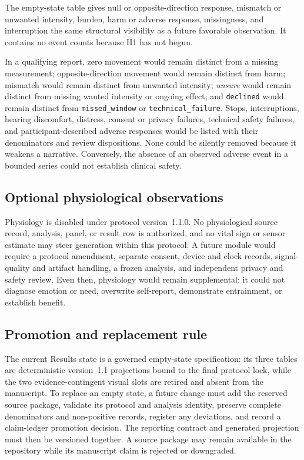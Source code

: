 The empty-state table gives null or opposite-direction response, mismatch or
unwanted intensity, burden, harm or adverse response, missingness, and
interruption the same structural visibility as a future favorable observation.
It contains no event counts because H1 has not begun.

\FloatBarrier

In a qualifying report, zero movement would remain distinct from a missing
measurement; opposite-direction movement would remain distinct from harm;
mismatch would remain distinct from unwanted intensity; \emph{unsure} would
remain distinct from missing wanted intensity or ongoing effect; and \texttt{declined} would
remain distinct from \texttt{missed\_window} or
\texttt{technical\_failure}. Stops,
interruptions, hearing discomfort, distress, consent or privacy failures,
technical safety failures, and participant-described adverse responses would
be listed with their denominators and review dispositions. None could be
silently removed because it weakens a narrative. Conversely, the absence of an
observed adverse event in a bounded series could not establish clinical safety.

\subsection{Optional physiological observations}
\label{sec:results-optional-physiology}

Physiology is disabled under protocol version~1.1.0. No physiological source
record, analysis, panel, or result row is authorized, and no vital sign or
sensor estimate may steer generation within this protocol. A future module
would require a protocol amendment, separate consent, device and clock records,
signal-quality and artifact handling, a frozen analysis, and independent
privacy and safety review. Even then, physiology would remain supplemental: it
could not diagnose emotion or need, overwrite self-report, demonstrate
entrainment, or establish benefit.

\subsection{Promotion and replacement rule}
\label{sec:results-promotion-rule}

The current Results state is a governed empty-state specification: its three
tables are deterministic version~1.1 projections bound to the final protocol
lock, while the two evidence-contingent visual slots are retired and absent
from the manuscript. To replace an empty state, a future change must add
the reserved source package, validate its protocol and analysis identity,
preserve complete denominators and non-positive records, register any
deviations, and record a claim-ledger promotion decision. The reporting
contract and generated projection must then be versioned together. A source
package may remain available in the repository while its manuscript claim is
rejected or downgraded.


